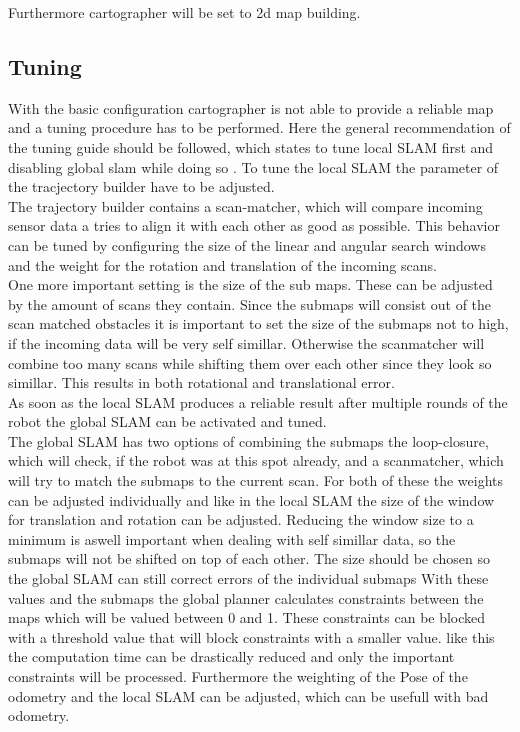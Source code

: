 Furthermore cartographer will be set to 2d map building.


\subsection{Tuning}
With the basic configuration cartographer is not able to provide a reliable map and a tuning procedure has to be performed. Here the general recommendation of the tuning guide should be followed, which states to tune local SLAM first and disabling global slam while doing so \cite{cartographertuning}.
To tune the local SLAM the parameter of the tracjectory builder have to be adjusted.\\
The trajectory builder contains a scan-matcher, which will compare incoming sensor data a tries to align it with each other as good as possible. This behavior can be tuned by configuring the size of the linear and angular search windows and the weight for the rotation and translation of the incoming scans.\\
One more important setting is the size of the sub maps. These can be adjusted by the amount of scans they contain. Since the submaps will consist out of the scan matched obstacles it is important to set the size of the submaps not to high, if the incoming data will be very self simillar. Otherwise the scanmatcher will combine too many scans while shifting them over each other since they look so simillar. This results in both rotational and translational error.\\
As soon as the local SLAM produces a reliable result after multiple rounds of the robot the global SLAM can be activated and tuned.\\

The global SLAM has two options of combining the submaps the loop-closure, which will check, if the robot was at this spot already, and a scanmatcher, which will try to match the submaps to the current scan. For both of these the weights can be adjusted individually and like in the local SLAM the size of the window for translation and rotation can be adjusted. Reducing the window size to a minimum is aswell important when dealing with self simillar data, so the submaps will not be shifted on top of each other. The size should be chosen so the global SLAM can still correct errors of the individual submaps 
With these values and the submaps the global planner calculates constraints between the maps which will be valued between 0 and 1. These constraints can be blocked with a threshold value that will block constraints with a smaller value. like this the computation time can be drastically reduced and only the important constraints will be processed. Furthermore the weighting of the Pose of the odometry and the local SLAM can be adjusted, which can be usefull with bad odometry.

